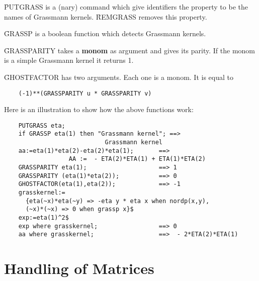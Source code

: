 \f{PUTGRASS} is a (nary) command which give
identifiers the property to be the names of Grassmann kernels.
\f{REMGRASS} removes this property.

\f{GRASSP} is a boolean function which detects
Grassmann kernels.

\f{GRASSPARITY} takes a {\bf monom}  as argument
and gives its parity.  If the monom is a simple Grassmann kernel it
returns 1.

\f{GHOSTFACTOR} has two arguments.  Each one is a
monom.  It is equal to
\begin{verbatim}
	(-1)**(GRASSPARITY u * GRASSPARITY v)
\end{verbatim}
Here is an illustration to show how the above functions work:
\begin{verbatim}
	PUTGRASS eta;
	if GRASSP eta(1) then "Grassmann kernel"; ==>
						    Grassmann kernel
	aa:=eta(1)*eta(2)-eta(2)*eta(1);       ==>
			      AA :=  - ETA(2)*ETA(1) + ETA(1)*ETA(2)
	GRASSPARITY eta(1);                    ==> 1
	GRASSPARITY (eta(1)*eta(2));           ==> 0
	GHOSTFACTOR(eta(1),eta(2));            ==> -1
	grasskernel:=
	  {eta(~x)*eta(~y) => -eta y * eta x when nordp(x,y),
	  (~x)*(~x) => 0 when grassp x}$
	exp:=eta(1)^2$
	exp where grasskernel;                 ==> 0
	aa where grasskernel;                  ==>  - 2*ETA(2)*ETA(1)
\end{verbatim}

\section{Handling of Matrices}

